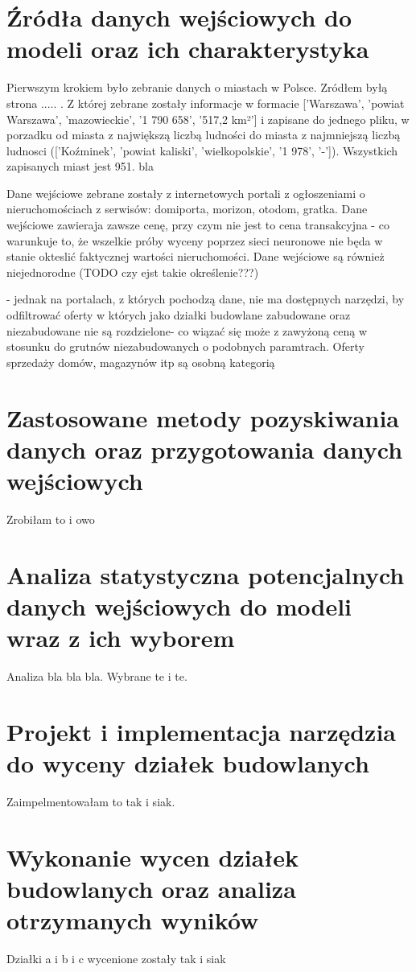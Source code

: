 \documentclass[a4paper,12pt,twoside,openany]{report}
\begin{document}
\chapter{Źródła danych wejściowych do modeli oraz ich charakterystyka}

Pierwszym krokiem było zebranie danych o miastach w Polsce.
Zródłem byłą strona ..... . Z której zebrane zostały informacje w formacie ['Warszawa', 'powiat Warszawa', 'mazowieckie', '1 790 658', '517,2 km²']
i zapisane do jednego pliku, w porzadku od miasta z największą liczbą ludności do miasta z najmniejszą liczbą ludnosci (['Koźminek', 'powiat kaliski', 'wielkopolskie', '1 978', '-']).
Wszystkich zapisanych miast jest 951.
bla


Dane wejściowe zebrane zostały  z internetowych portali z ogłoszeniami o nieruchomościach z serwisów: domiporta, morizon, otodom, gratka.
Dane wejściowe zawieraja zawsze cenę, przy czym nie jest to cena transakcyjna - co warunkuje to, że wszelkie próby wyceny poprzez sieci neuronowe nie będa w stanie okteslić faktycznej wartości nieruchomości.
Dane wejściowe są również niejednorodne (TODO czy ejst takie określenie???)


- jednak na portalach, z których pochodzą dane, nie ma dostępnych narzędzi, by odfiltrować oferty w których jako działki budowlane zabudowane oraz niezabudowane nie są rozdzielone- co wiązać się może z zawyżoną ceną w stosunku do grutnów niezabudowanych o podobnych paramtrach.
Oferty sprzedaży domów, magazynów itp są osobną kategorią


\chapter{Zastosowane metody pozyskiwania danych oraz przygotowania danych wejściowych}
Zrobiłam to i owo
\chapter{Analiza statystyczna potencjalnych danych wejściowych do modeli wraz z ich wyborem}
Analiza bla bla bla.
Wybrane te i te.
\chapter{Projekt i implementacja narzędzia do wyceny działek budowlanych}
Zaimpelmentowałam to tak i siak.
\chapter{Wykonanie wycen działek budowlanych oraz analiza otrzymanych wyników}
Działki a i b i c wycenione zostały tak i siak
\end{document}
